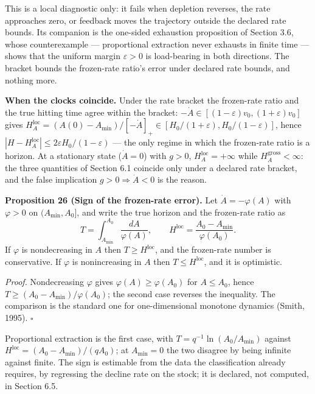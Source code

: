 \documentclass[11pt]{article}
\begin{document}
This is a local diagnostic only: it fails when depletion reverses, the
rate approaches zero, or feedback moves the trajectory outside the
declared rate bounds. Its companion is the one-sided exhaustion
proposition of Section 3.6, whose counterexample --- proportional
extraction never exhausts in finite time --- shows that the uniform
margin \(\varepsilon > 0\) is load-bearing in both directions. The
bracket bounds the frozen-rate ratio's error under declared rate bounds,
and nothing more.

\textbf{When the clocks coincide.} Under the rate bracket the
frozen-rate ratio and the true hitting time agree within the bracket:
\(-\dot A \in [(1-\varepsilon)v_0, (1+\varepsilon)v_0]\) gives
\(H_A^{\mathrm{loc}} = (A(0) - A_{\min})/[-\dot A]_+ \in [H_0/(1+\varepsilon), H_0/(1-\varepsilon)]\),
hence \(|H - H_A^{\mathrm{loc}}| \le 2\varepsilon H_0/(1-\varepsilon)\)
--- the only regime in which the frozen-rate ratio is a horizon. At a
stationary state (\(\dot A = 0\)) with \(g > 0\),
\(H_A^{\mathrm{loc}} = +\infty\) while
\(H_A^{\mathrm{gross}} < \infty\): the three quantities of Section 6.1
coincide only under a declared rate bracket, and the false implication
\(g > 0 \Rightarrow \dot A < 0\) is the reason.

\textbf{Proposition 26 (Sign of the frozen-rate error).} Let \(\dot A=-\varphi(A)\) with \(\varphi>0\) on
\((A_{\min},A_0]\), and write the true horizon and the frozen-rate ratio as
\[ T=\int_{A_{\min}}^{A_0}\frac{dA}{\varphi(A)}, \qquad H^{\mathrm{loc}}=\frac{A_0-A_{\min}}{\varphi(A_0)} . \]
If \(\varphi\) is nondecreasing in \(A\) then \(T\ge H^{\mathrm{loc}}\), and the frozen-rate number
is conservative. If \(\varphi\) is nonincreasing in \(A\) then \(T\le H^{\mathrm{loc}}\), and it is
optimistic.

\emph{Proof.} Nondecreasing \(\varphi\) gives \(\varphi(A)\ge\varphi(A_0)\) for \(A\le A_0\), hence
\(T\ge(A_0-A_{\min})/\varphi(A_0)\); the second case reverses the inequality. The comparison is the
standard one for one-dimensional monotone dynamics (Smith, 1995). \ensuremath{\square}

Proportional extraction is the first case, with \(T=q^{-1}\ln(A_0/A_{\min})\) against
\(H^{\mathrm{loc}}=(A_0-A_{\min})/(qA_0)\); at \(A_{\min}=0\) the two disagree by being infinite
against finite. The sign is estimable from the data the classification already requires, by
regressing the decline rate on the stock; it is declared, not computed, in Section 6.5.
\end{document}
